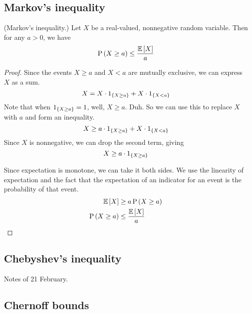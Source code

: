 \documentclass[11pt]{article}
\begin{document}
\subsection{Markov's inequality}

\begin{thm}{(Markov's inequality.)}
    Let $X$ be a real-valued, nonnegative random variable.
    Then for any $a > 0$, we have
    \begin{equation}
        \label{eq:markov-inequality}
        \operatorname{P}{\left(X \geq a\right)} \leq \frac{\operatorname{\mathbb{E}}{\left[X\right]}}{a}
    \end{equation}
\end{thm}

\begin{proof}
    Since the events $X \geq a$ and $X < a$ are mutually exclusive, we can
    express $X$ as a sum.
    \begin{equation*}
        X = X \cdot 1_{\left\{X \geq a\right\}} + X \cdot 1_{\left\{X < a\right\}}
    \end{equation*}
    Note that when $1_{\left\{X \geq a\right\}} = 1$, well, $X \geq a$. Duh.
    So we can use this to replace $X$ with $a$ and form an inequality.
    \begin{equation*}
        X \geq a \cdot 1_{\left\{X \geq a\right\}} + X \cdot 1_{\left\{X < a\right\}}
    \end{equation*}
    Since $X$ is nonnegative, we can drop the second term, giving
    \begin{equation*}
        X \geq a \cdot 1_{\left\{X \geq a\right\}}
    \end{equation*}

    Since expectation is monotone, we can take it both sides.
    We use the linearity of expectation and the fact that the expectation of an
    indicator for an event is the probability of that event.
    \begin{align*}
        \operatorname{\mathbb{E}}{\left[X\right]} &\geq a \operatorname{P}{\left(X \geq a\right)} \\
        \operatorname{P}{\left(X \geq a\right)} & \leq \frac{\operatorname{\mathbb{E}}{\left[X\right]}}{a}
    \end{align*}
\end{proof}

\subsection{Chebyshev's inequality}

Notes of 21 February.

\subsection{Chernoff bounds}
\end{document}
